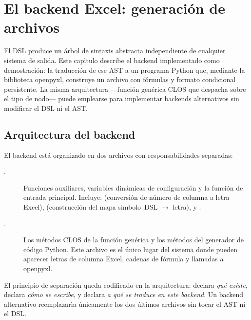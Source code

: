\chapter{El backend Excel: generaci\'on de archivos \xlsx{}}
\label{cap:generacion}

El DSL produce un \'arbol de sintaxis abstracta independiente de cualquier
sistema de salida.  Este cap\'{\i}tulo describe el backend implementado como
demostraci\'on: la traducci\'on de ese AST a un programa Python que, mediante
la biblioteca openpyxl, construye un archivo \xlsx{} con f\'ormulas y formato
condicional persistente.  La misma arquitectura ---funci\'on gen\'erica CLOS
que despacha sobre el tipo de nodo--- puede emplearse para implementar
backends alternativos sin modificar el DSL ni el AST.

\section{Arquitectura del backend}
\label{sec:arquitectura-backend}

El backend est\'a organizado en dos archivos con responsabilidades separadas:

\begin{description}
  \item[.] Funciones auxiliares, variables
    din\'amicas de configuraci\'on y la funci\'on de entrada principal.
    Incluye:  (conversi\'on de n\'umero de columna a letra
    Excel),  (construcci\'on del mapa s\'{\i}mbolo~DSL
    $\to$ letra),  y .

  \item[.] Los m\'etodos CLOS de la
    funci\'on gen\'erica  y los m\'etodos del
    generador de c\'odigo Python.  Este archivo es el \'unico lugar del
    sistema donde pueden aparecer letras de columna Excel, cadenas de
    f\'ormula y llamadas a openpyxl.
\end{description}

El principio de separaci\'on queda codificado en la arquitectura:
 declara \emph{qu\'e existe},
 declara \emph{c\'omo se escribe},
y  declara \emph{a qu\'e se traduce en
este backend}.  Un backend alternativo reemplazar\'{\i}a \'unicamente los
dos \'ultimos archivos sin tocar el AST ni el DSL.

